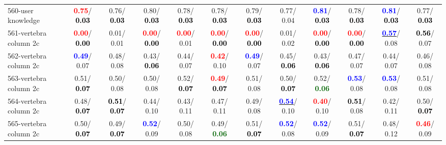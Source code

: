 \begin{table}[h]
\begin{center}
{\begin{tabular}{lc|c|c|c|c|c|c|c|c|c|c}
560-user knowledge & \textcolor{red}{\textbf{  0.75}}/\textcolor{black}{\textbf{  0.03}} &   0.76/\textcolor{black}{\textbf{  0.03}} &   0.80/\textcolor{black}{\textbf{  0.03}} &   0.78/\textcolor{black}{\textbf{  0.03}} &   0.78/\textcolor{black}{\textbf{  0.03}} &   0.79/\textcolor{black}{\textbf{  0.03}} &   0.77/  0.04 & \textcolor{blue}{\textbf{  0.81}}/\textcolor{black}{\textbf{  0.03}} &   0.78/\textcolor{black}{\textbf{  0.03}} & \textcolor{blue}{\textbf{  0.81}}/\textcolor{black}{\textbf{  0.03}} &   0.77/\textcolor{black}{\textbf{  0.03}} \\
561-vertebra column 2c & \textcolor{red}{\textbf{  0.00}}/\textcolor{black}{\textbf{  0.00}} &   0.01/  0.01 & \textcolor{red}{\textbf{  0.00}}/\textcolor{black}{\textbf{  0.00}} & \textcolor{red}{\textbf{  0.00}}/  0.01 & \textcolor{red}{\textbf{  0.00}}/\textcolor{black}{\textbf{  0.00}} & \textcolor{red}{\textbf{  0.00}}/\textcolor{black}{\textbf{  0.00}} &   0.01/  0.02 & \textcolor{red}{\textbf{  0.00}}/\textcolor{black}{\textbf{  0.00}} & \textcolor{red}{\textbf{  0.00}}/\textcolor{black}{\textbf{  0.00}} & \underline{\textcolor{blue}{\textbf{  0.57}}}/  0.08 & \textcolor{black}{\textbf{  0.56}}/  0.07 \\
562-vertebra column 2c & \textcolor{blue}{\textbf{  0.49}}/  0.07 &   0.48/  0.08 &   0.43/\textcolor{black}{\textbf{  0.06}} &   0.44/  0.07 & \textcolor{red}{\textbf{  0.42}}/  0.10 & \textcolor{blue}{\textbf{  0.49}}/  0.07 &   0.45/\textcolor{black}{\textbf{  0.06}} &   0.43/\textcolor{black}{\textbf{  0.06}} &   0.47/  0.07 &   0.44/  0.07 &   0.46/  0.08 \\
563-vertebra column 2c &   0.51/\textcolor{black}{\textbf{  0.07}} &   0.50/  0.08 &   0.50/  0.08 &   0.52/\textcolor{black}{\textbf{  0.07}} & \textcolor{red}{\textbf{  0.49}}/\textcolor{black}{\textbf{  0.07}} &   0.51/  0.08 &   0.50/\textcolor{black}{\textbf{  0.07}} &   0.52/\textcolor{darkgreen}{\textbf{  0.06}} & \textcolor{blue}{\textbf{  0.53}}/  0.08 & \textcolor{blue}{\textbf{  0.53}}/  0.08 &   0.51/  0.08 \\
564-vertebra column 2c &   0.48/\textcolor{black}{\textbf{  0.07}} & \textcolor{black}{\textbf{  0.51}}/\textcolor{black}{\textbf{  0.07}} &   0.44/  0.10 &   0.43/  0.11 &   0.47/  0.11 &   0.49/  0.08 & \underline{\textcolor{blue}{\textbf{  0.54}}}/  0.10 & \textcolor{red}{\textbf{  0.40}}/  0.10 & \textcolor{black}{\textbf{  0.51}}/  0.08 &   0.42/  0.11 &   0.50/\textcolor{black}{\textbf{  0.07}} \\
565-vertebra column 2c &   0.50/\textcolor{black}{\textbf{  0.07}} &   0.49/\textcolor{black}{\textbf{  0.07}} & \textcolor{blue}{\textbf{  0.52}}/  0.09 &   0.50/  0.08 &   0.49/\textcolor{darkgreen}{\textbf{  0.06}} &   0.51/\textcolor{black}{\textbf{  0.07}} & \textcolor{blue}{\textbf{  0.52}}/  0.08 & \textcolor{blue}{\textbf{  0.52}}/  0.09 &   0.51/\textcolor{black}{\textbf{  0.07}} &   0.48/  0.12 & \textcolor{red}{\textbf{  0.46}}/  0.09 \\ \hline

\end{tabular}}
\end{center}
\end{table}
